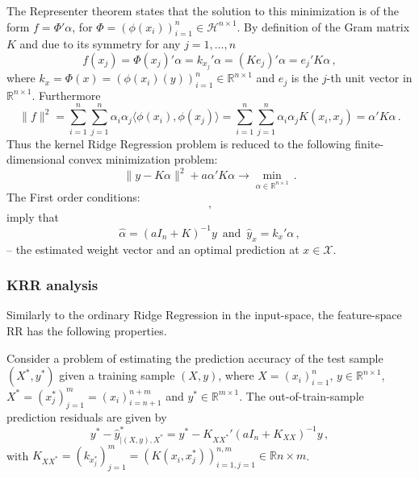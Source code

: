 \documentclass[a4paper,14pt]{article}
\newcommand{\Xcal}{\mathcal{X}}
\newcommand{\Hcal}{\mathcal{H}}
\newcommand{\Real}{\mathbb{R}}
\begin{document}
The Representer theorem states that the solution to this minimization is of the form
$f = \Phi'\alpha$, for $\Phi = (\phi(x_i))_{i=1}^n \in \Hcal^{n\times 1}$. By definition
of the Gram matrix $K$ and due to its symmetry for any $j=1,\ldots,n$
$$ f(x_j)
  = \Phi(x_j)' \alpha
  = k_{x_j}' \alpha
  = (K e_j)' \alpha
  = e_j' K \alpha
  \,, $$
where $k_x = \Phi(x) = (\phi(x_i)(y))_{i=1}^n \in \Real^{n\times 1}$ and $e_j$ is
the $j$-th unit vector in $\Real^{n\times 1}$. Furthermore
$$ \| f \|^2
  = \sum_{i=1}^n\sum_{j=1}^n\alpha_i\alpha_j \langle\phi(x_i), \phi(x_j)\rangle
  = \sum_{i=1}^n\sum_{j=1}^n\alpha_i\alpha_j K(x_i, x_j)
  = \alpha' K \alpha \,. $$
Thus the kernel Ridge Regression problem is reduced to the following finite-dimensional
convex minimization problem:
$$ \|y - K \alpha \|^2 + a \alpha' K \alpha \to \min_{\alpha\in \Real^{n\times 1}} \,. $$
The First order conditions:
$$ \,, $$
imply that
$$ \hat{\alpha} = (aI_n + K)^{-1} y \,\text{ and }\, \hat{y}_x = k_x' \alpha \,, $$
-- the estimated weight vector and an optimal prediction at $x\in \Xcal$.


\subsubsection{KRR analysis} %
\label{ssub:krr_analysis}

Similarly to the ordinary Ridge Regression in the input-space, the feature-space RR
has the following properties.

Consider a problem of estimating the prediction accuracy of the test sample $(X^*, y^*)$
given a training sample $(X, y)$, where $X = (x_i)_{i=1}^n$, $y\in \Real^{n\times 1}$,
$X^* = (x^*_j)_{j=1}^m = (x_i)_{i=n+1}^{n+m}$ and $y^*\in \Real^{m\times 1}$. 
The out-of-train-sample prediction residuals are given by
$$ y^* - \hat{y}^*_{|(X, y), X^*}
  = y^* - K_{XX^*}' (a I_n + K_{XX})^{-1} y
  \,, $$
with $K_{XX^*} = (k_{x^*_j})_{j=1}^m = (K(x_i, x^*_j))_{i=1,j=1}^{n,m} \in \Real{n\times m}$.
\end{document}
